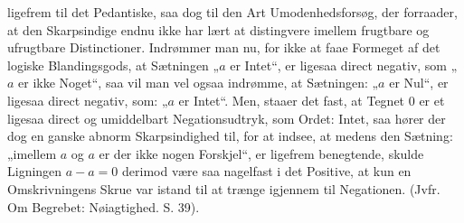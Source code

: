 \documentclass[12pt,a4paper]{book}
\begin{document}
ligefrem til det Pedantiske, saa dog til den Art Umodenhedsforsøg, der
forraader, at den Skarpsindige endnu ikke har lært at distingvere
imellem frugtbare og ufrugtbare Distinctioner. Indrømmer man nu, for
ikke at faae Formeget af det logiske Blandingsgods, at Sætningen „$a$
er Intet“, er ligesaa direct negativ, som „$a$ er ikke Noget“, saa vil
man vel ogsaa indrømme, at Sætningen: „$a$ er Nul“, er ligesaa direct
negativ, som: „$a$ er Intet“. Men, staaer det fast, at Tegnet $0$ er
et ligesaa direct og umiddelbart Negationsudtryk, som Ordet: Intet,
saa hører der dog en ganske abnorm Skarpsindighed til, for at indsee,
at medens den Sætning: „imellem $a$ og $a$ er der ikke nogen
Forskjel“, er ligefrem benegtende, skulde Ligningen $a - a = 0$
derimod være saa nagelfast i det Positive, at kun en Omskrivningens
Skrue var istand til at trænge igjennem til Negationen. (Jvfr. Om
Begrebet: Nøiagtighed. S. 39).
\end{document}
